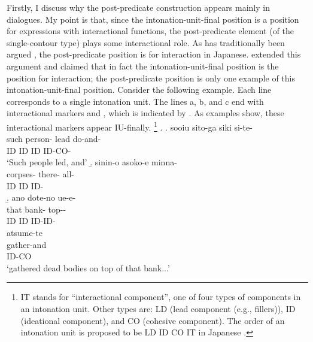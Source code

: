 Firstly, I discuss why the post-predicate construction appears mainly in dialogues.
My point is that,
since the intonation-unit-final position is a position for expressions with interactional functions,
the post-predicate element (of the single-contour type) plays some interactional role.
As has traditionally been argued \cite[e.g.,][]{watanabe71},
the post-predicate position is for interaction in Japanese.
 extended this argument and claimed that
in fact the intonation-unit-final position is the position for interaction;
the post-predicate position is only one example of this intonation-unit-final position.
Consider the following example.
Each line corresponds to a single intonation unit.
The lines a, b, and c end with interactional markers  and ,
which is indicated by .
As examples \Next show,
these interactional markers appear IU-finally.%
	\footnote{
	IT stands for ``interactional component'',
	one of four types of components in an intonation unit.
	Other types are:
	LD (lead component (e.g., fillers)),
	ID (ideational component), and
	CO (cohesive component).
	The order of an intonation unit is proposed to be
	LD ID CO IT in Japanese \cite[][44]{iwasaki93}.
	}
%
\ex.
 \a.
 \glll sooiu sito-ga siki si-te- \\
 	such person- lead do-and- \\
	ID ID ID ID-CO-	 \\
	\glt `Such people led, and'
 \b.
 \glll sinin-o asoko-e minna- \\
 		corpses- there- all- \\
		ID ID ID- \\
 \b.
 \glll ano dote-no ue-e- \\
 		that bank- top-- \\
		ID ID ID-ID- \\
 \glll atsume-te \\
 		gather-and \\
		ID-CO \\
	\glt `gathered dead bodies on top of that bank...'
	\hfill{\cite[][47, gloss and transcription modified by the current author]{iwasaki93}}

